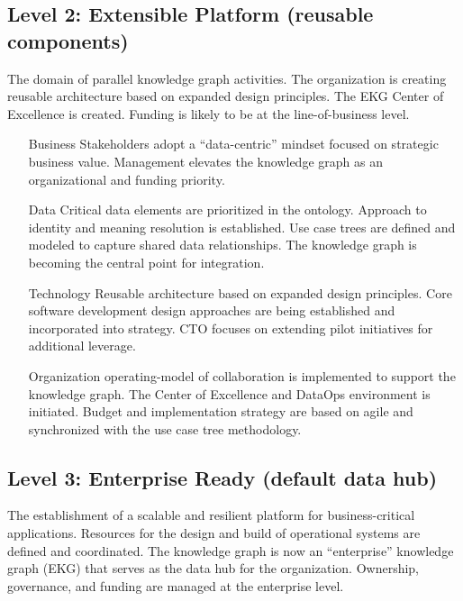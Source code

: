 \subsection{Level 2: Extensible Platform (reusable components)}

The domain of parallel knowledge graph activities.
The organization is creating reusable architecture based on expanded design principles.
The EKG Center of Excellence is created.
Funding is likely to be at the line-of-business level.

\begin{itemize}[leftmargin=1in,font=\bfseries]

    \item[Business]     Stakeholders adopt a “data-centric” mindset focused on strategic business value.
                        Management elevates the knowledge graph as an organizational and funding priority.
    \item[Data]         Critical data elements are prioritized in the ontology.
                        Approach to identity and meaning resolution is established.
                        Use case trees are defined and modeled to capture shared data relationships.
                        The knowledge graph is becoming the central point for integration.
    \item[Technology]   Reusable architecture based on expanded design principles.
                        Core software development design approaches are being established and incorporated
                        into strategy.
                        CTO focuses on extending pilot initiatives for additional leverage.
    \item[Organization] \Gls{operating-model} of collaboration is implemented to support the knowledge graph.
                        The Center of Excellence and DataOps environment is initiated.
                        Budget and implementation strategy are based on agile and synchronized with the
                        use case tree methodology.

\end{itemize}

\subsection{Level 3: Enterprise Ready (default data hub)}

The establishment of a scalable and resilient platform for business-critical applications.
Resources for the design and build of operational systems are defined and coordinated.
The knowledge graph is now an “enterprise” knowledge graph (EKG) that serves as the data hub for the organization.
Ownership, governance, and funding are managed at the enterprise level.

